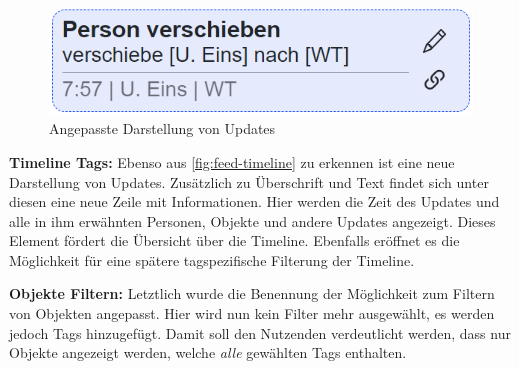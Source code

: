 \begin{figure}[htp]
    \centering
    \includegraphics[width=.6\textwidth]{images/4-Feedback/timeline.png}
    \caption{Angepasste Darstellung von Updates}
    \label{fig:feed-timeline}
\end{figure}

\textbf{Timeline Tags:} Ebenso aus \autoref{fig:feed-timeline} zu erkennen ist eine neue Darstellung von Updates.
Zusätzlich zu Überschrift und Text findet sich unter diesen eine neue Zeile mit Informationen.
Hier werden die Zeit des Updates und alle in ihm erwähnten Personen, Objekte und andere Updates angezeigt.
Dieses Element fördert die Übersicht über die Timeline.
Ebenfalls eröffnet es die Möglichkeit für eine spätere tagspezifische Filterung der Timeline.

\textbf{Objekte Filtern:} Letztlich wurde die Benennung der Möglichkeit zum Filtern von Objekten angepasst.
Hier wird nun kein Filter mehr ausgewählt, es werden jedoch Tags hinzugefügt.
Damit soll den Nutzenden verdeutlicht werden, dass nur Objekte angezeigt werden, welche \textit{alle} gewählten Tags enthalten.